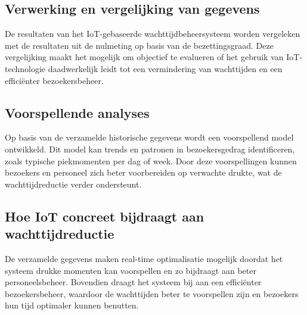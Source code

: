 \subsection{Verwerking en vergelijking van gegevens}
De resultaten van het IoT-gebaseerde wachttijdbeheersysteem worden vergeleken met de resultaten uit de nulmeting op basis van de bezettingsgraad. Deze vergelijking maakt het mogelijk om objectief te evalueren of het gebruik van IoT-technologie daadwerkelijk leidt tot een vermindering van wachttijden en een efficiënter bezoekersbeheer.


\subsection{Voorspellende analyses}
Op basis van de verzamelde historische gegevens wordt een voorspellend model ontwikkeld. Dit model kan trends en patronen in bezoekersgedrag identificeren, zoals typische piekmomenten per dag of week. Door deze voorspellingen kunnen bezoekers en personeel zich beter voorbereiden op verwachte drukte, wat de wachttijdreductie verder ondersteunt. 

\subsection{Hoe IoT concreet bijdraagt aan wachttijdreductie}
De verzamelde gegevens maken real-time optimalisatie mogelijk doordat het systeem drukke momenten kan voorspellen en zo bijdraagt aan beter personeelsbeheer. Bovendien draagt het systeem bij aan een efficiënter bezoekersbeheer, waardoor de wachttijden beter te voorspellen zijn en bezoekers hun tijd optimaler kunnen benutten.


